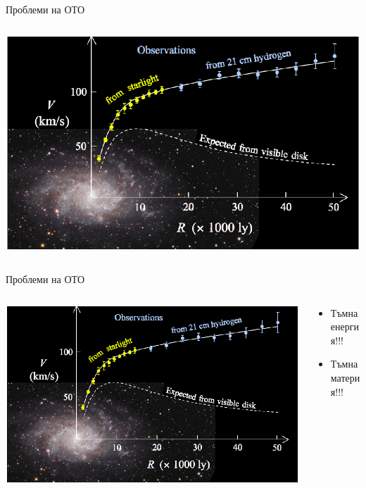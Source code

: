 \documentclass[10pt,a4paper]{beamer}
\begin{document}
        \begin{frame}{ Проблеми на ОТО }
            \begin{columns}
                \begin{column}{0.9\textwidth}
                    \includegraphics[width=\textwidth]{images/big_bang_dark_matter.png}
                \end{column}
            \end{columns}
        \end{frame}
        
        \begin{frame}{ Проблеми на ОТО }
            \begin{columns}
                \begin{column}{0.5\textwidth}
                    \includegraphics[width=\textwidth]{images/big_bang_dark_matter.png}
                \end{column}
                \begin{column}{0.5\textwidth}
                    \begin{itemize}
                        \item Тъмна енергия!!!
                        \item Тъмна материя!!!
                    \end{itemize}
                \end{column}
            \end{columns}
        \end{frame}
        
\end{document}
